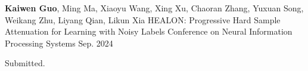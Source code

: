 \begin{cventries}
  \cventry
  {\textbf{Kaiwen Guo}, Ming Ma, Xiaoyu Wang, Xing Xu, Chaoran Zhang, Yuxuan Song, Weikang Zhu, Liyang Qian, Likun Xia} %
  {HEALON: Progressive Hard Sample Attenuation for Learning with Noisy Labels} %
  {Conference on Neural Information Processing Systems} %
  {Sep. 2024} %
  {
    \begin{cvitems}
      \item{Submitted.}
    \end{cvitems}
  }


\end{cventries}



